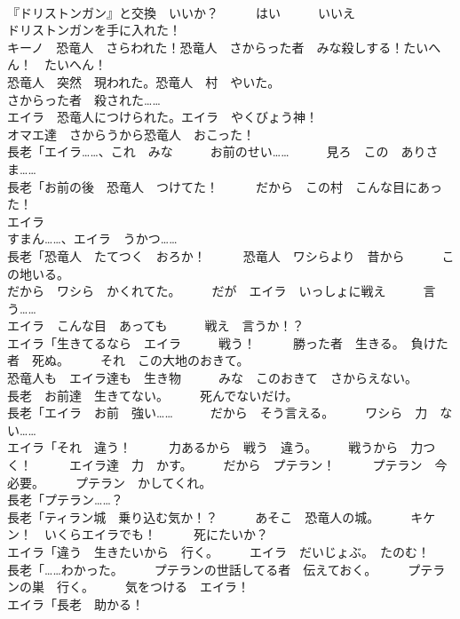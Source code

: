 \documentclass[8pt]{extreport}
\begin{document}
\begin{CJK}{UTF8}{min}
\\	『ドリストンガン』と交換　いいか？　　　はい　　　いいえ	
\\	ドリストンガンを手に入れた！	
\\	キーノ　恐竜人　さらわれた！恐竜人　さからった者　みな殺しする！たいへん！　たいへん！	
\\	恐竜人　突然　現われた。恐竜人　村　やいた。 
\\	さからった者　殺された…… 
\\	エイラ　恐竜人につけられた。エイラ　やくびょう神！	
\\	オマエ達　さからうから恐竜人　おこった！	
\\	長老「エイラ……、これ　みな　　　お前のせい……　　　見ろ　この　ありさま……	
\\	長老「お前の後　恐竜人　つけてた！　　　だから　この村　こんな目にあった！	
\\	エイラ
\\	すまん……、エイラ　うかつ……	
\\	長老「恐竜人　たてつく　おろか！　　　恐竜人　ワシらより　昔から　　　この地いる。	
\\	だから　ワシら　かくれてた。　　　だが　エイラ　いっしょに戦え　　　言う……	
\\	エイラ　こんな目　あっても　　　戦え　言うか！？	
\\	エイラ「生きてるなら　エイラ　　　戦う！　　　勝った者　生きる。　負けた者　死ぬ。　　　それ　この大地のおきて。	
\\	恐竜人も　エイラ達も　生き物　　　みな　このおきて　さからえない。	
\\	長老　お前達　生きてない。　　　死んでないだけ。	
\\	長老「エイラ　お前　強い……　　　だから　そう言える。　　　ワシら　力　ない……	
\\	エイラ「それ　違う！　　　力あるから　戦う　違う。　　　戦うから　力つく！　　　エイラ達　力　かす。　　　だから　プテラン！　　　プテラン　今　必要。　　　プテラン　かしてくれ。	
\\	長老「プテラン……？	
\\	長老「ティラン城　乗り込む気か！？　　　あそこ　恐竜人の城。　　　キケン！　いくらエイラでも！　　　死にたいか？	
\\	エイラ「違う　生きたいから　行く。　　　エイラ　だいじょぶ。　たのむ！	
\\	長老「……わかった。　　　プテランの世話してる者　伝えておく。　　　プテランの巣　行く。　　　気をつける　エイラ！	
\\	エイラ「長老　助かる！	

\end{CJK}
\end{document}
